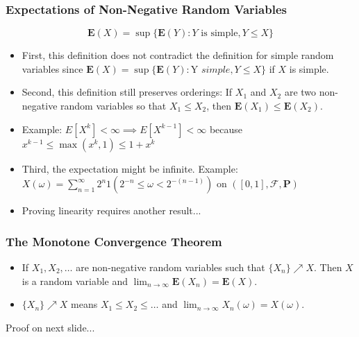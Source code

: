 \documentclass[handout]{beamer}
\newcommand{\BP}{\mathbf{P}}
\newcommand{\BE}{\mathbf{E}}
\begin{document}
\frame
{
\frametitle{Expectations of Non-Negative Random Variables}

$$\BE(X)=\sup\{\BE(Y): Y\text{ is simple}, Y\leq X\}$$


\begin{itemize}

\item<2->First, this definition does not contradict the definition for simple random variables since $\BE(X)=\sup\{\BE(Y): \text{Y } simple, Y\leq X\}$ if $X$ is simple.
 
\item<3->Second, this definition still preserves orderings: If $X_1$ and $X_2$ are two non-negative random variables so that $X_1\leq X_2$, then $\BE(X_1)\leq \BE(X_2)$. 

\item<4-> Example: $E[X^k] < \infty \implies E[X^{k-1}] < \infty$ because $x^{k-1} \le \max(x^k,1) \le 1 + x^k$

\item<5->Third, the expectation might be infinite. Example: $X(\omega) = \sum_{n=1}^{\infty} 2^n 1(2^{-n} \le \omega < 2^{-(n-1)})$ on $([0,1], \mathcal{F}, \BP)$

\item<6-> Proving linearity requires another result...

\end{itemize}
}


\frame
{
  \frametitle{The Monotone Convergence Theorem}

\begin{itemize}

\item<1->[]
\begin{Theorem} 
If $X_1, X_2, \ldots$ are non-negative random variables such that $\{X_n\} \nearrow X$. Then $X$ is a random variable and $\lim_{n\rightarrow \infty} \BE(X_n)=\BE(X)$. 
\end{Theorem}

\item<2->[]
$\{X_n\} \nearrow X$ means $X_1 \le X_2 \le \ldots$ and $\lim_{n \to \infty} X_n(\omega) = X(\omega)$.

\end{itemize}

Proof on next slide...
}
\end{document}
